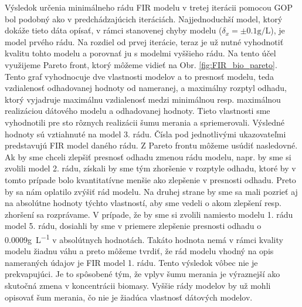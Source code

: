 Výsledok určenia minimálneho rádu FIR modelu v tretej iterácii pomocou GOP bol podobný ako v predchádzajúcich iteráciách. Najjednoduchší model, ktorý dokáže tieto dáta opísať, v rámci stanovenej chyby modelu ($ \delta_{x}=\pm0.1\si{\gram\per\liter} $), je model prvého rádu.
Na rozdiel od prvej iterácie, teraz je už nutné vyhodnotiť kvalitu tohto modelu a porovnať ju s modelmi vyššieho rádu. Na tento účel využijeme Pareto front, ktorý môžeme vidieť na Obr. \ref{fig:FIR_bio_pareto}. Tento graf vyhodnocuje dve vlastnosti modelov a to presnosť modelu, teda vzdialenosť odhadovanej hodnoty od nameranej, a maximálny rozptyl odhadu, ktorý vyjadruje maximálnu vzdialenosť medzi minimálnou resp. maximálnou realizáciou dátového modelu a odhadovanej hodnoty. Tieto vlastnosti sme vyhodnotili pre sto rôznych realizácii šumu merania a spriemerovali. Výsledné hodnoty sú vztiahnuté na model 3. rádu. Čísla pod jednotlivými ukazovateľmi predstavujú FIR model daného rádu. Z Pareto frontu môžeme usúdiť nasledovné. Ak by sme chceli zlepšiť presnosť odhadu zmenou rádu modelu, napr. by sme si zvolili model 2. rádu, získali by sme tým zhoršenie v rozptyle odhadu, ktoré by v tomto prípade bolo kvantitatívne menšie ako zlepšenie v presnosti odhadu. Preto by sa nám oplatilo zvýšiť rád modelu. Na druhej strane by sme sa mali pozrieť aj na absolútne hodnoty týchto vlastností, aby sme vedeli o akom zlepšení resp. zhoršení sa rozprávame. V prípade, že by sme si zvolili namiesto modelu 1. rádu model 5. rádu, dosiahli by sme v priemere zlepšenie presnosti odhadu o 0.0009\si{\gram\per\liter} v absolútnych hodnotách. Takáto hodnota nemá v rámci kvality modelu žiadnu váhu a preto môžeme tvrdiť, že rád modelu vhodný na opis nameraných údajov je FIR model 1. rádu. Tento výsledok vôbec nie je prekvapujúci. Je to spôsobené tým, že vplyv šumu merania je výraznejší ako skutočná zmena v koncentrácii biomasy. Vyššie rády modelov by už mohli opisovať šum merania, čo nie je žiadúca vlastnosť dátových modelov. 

